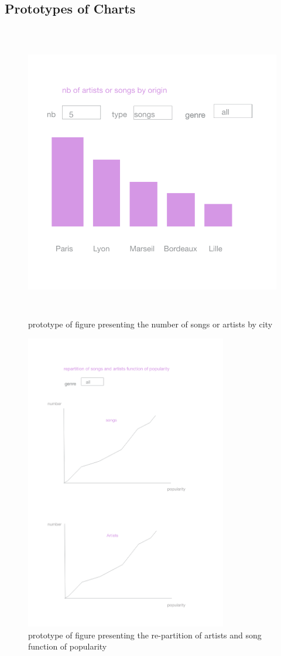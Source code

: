 \documentclass[12pt]{article}
\begin{document}
\subsection{Prototypes of Charts}
\begin{figure}
    \centering
    \includegraphics[height=13cm]{city.png}
    \caption{prototype of figure presenting the number of songs or artists by city}
    \label{fig:my_label}
\end{figure}
\begin{figure}
    \centering
    \includegraphics[height=13cm]{culukated.png}
    \caption{prototype of figure presenting the re-partition of artists and song function of popularity}
    \label{fig:my_label}
\end{figure}
\end{document}

